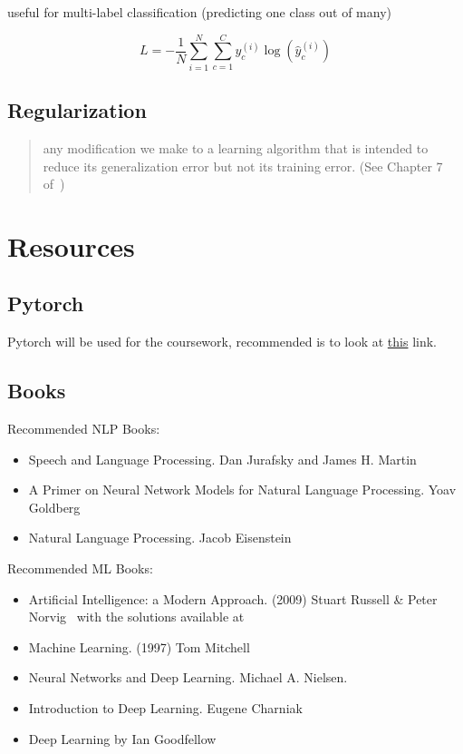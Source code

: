 \documentclass[11pt]{article}
\begin{document}
useful for multi-label classification (predicting one class out of many)

\begin{equation}
    L = - \frac 1 N \sum^N_{i=1}\sum^C_{c=1} y_c^{(i)}\log(\hat{y}_c^{(i)})
\end{equation}

\subsection{Regularization}

\begin{quote}
    any modiﬁcation we make to a learning algorithm that is intended to reduce its generalization error but not its training error. (See Chapter 7 of~\cite{Goodfellow-et-al-2016})
\end{quote}

\section{Resources}

\subsection{Pytorch}

Pytorch will be used for the coursework, recommended is to look at \href{https://pytorch.org/tutorials/beginner/deep_learning_60min_blitz.html}{this} link.

\subsection{Books}

Recommended NLP Books:

\begin{itemize}
    \item Speech and Language Processing. Dan Jurafsky and James H. Martin~\cite{book-speech-and-language-processing}
    \item A Primer on Neural Network Models for Natural Language Processing.
          Yoav Goldberg~\cite{primer-on-nlp}
    \item Natural Language Processing. Jacob Eisenstein~\cite{git-natural-language-processing}
\end{itemize}

Recommended ML Books:

\begin{itemize}
    \item Artificial Intelligence: a Modern Approach. (2009) Stuart Russell \& Peter Norvig~\cite{AI-modern-approach} with the solutions available at~\cite{AI-modern-approach-slutions}
    \item Machine Learning. (1997) Tom Mitchell~\cite{tom-mitchell-book}
    \item Neural Networks and Deep Learning. Michael A. Nielsen.
    \item Introduction to Deep Learning. Eugene Charniak~\cite{intro-to-dl-eugene-charniak}
    \item Deep Learning by Ian Goodfellow~\cite{Goodfellow-et-al-2016}
\end{itemize}
\end{document}

